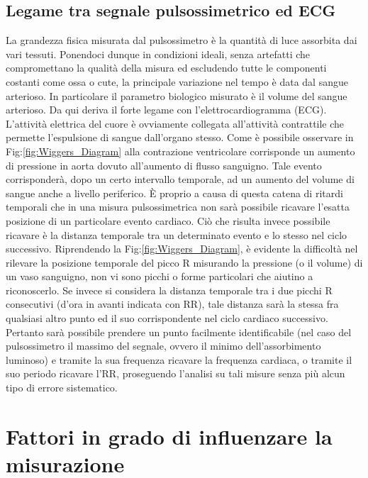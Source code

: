 \documentclass[a4paper, 12pt]{book}
\begin{document}
\subsection{Legame tra segnale pulsossimetrico ed ECG}

La grandezza fisica misurata dal pulsossimetro è la quantità di luce assorbita dai vari tessuti.
Ponendoci dunque in condizioni ideali, senza artefatti che compromettano la qualità della misura ed escludendo tutte le componenti costanti come ossa o cute, la principale variazione nel tempo è data dal sangue arterioso.
In particolare il parametro biologico misurato è il volume del sangue arterioso.
Da qui deriva il forte legame con l'elettrocardiogramma (ECG).
L'attività elettrica del cuore è ovviamente collegata all'attività contrattile che permette l'espulsione di sangue dall'organo stesso.
Come è possibile osservare in Fig:\ref{fig:Wiggers_Diagram} alla contrazione ventricolare corrisponde un aumento di pressione in aorta dovuto all'aumento di flusso sanguigno.
Tale evento corrisponderà, dopo un certo intervallo temporale, ad un aumento del volume di sangue anche a livello periferico.
È proprio a causa di questa catena di ritardi temporali che in una misura pulsossimetrica non sarà possibile ricavare l'esatta posizione di un particolare evento cardiaco.
Ciò che risulta invece possibile ricavare è la distanza temporale tra un determinato evento e lo stesso nel ciclo successivo.
Riprendendo la Fig:\ref{fig:Wiggers_Diagram}, è evidente la difficoltà nel rilevare la posizione temporale del picco R misurando la pressione (o il volume) di un vaso sanguigno, non vi sono picchi o forme particolari che aiutino a riconoscerlo.
Se invece si considera la distanza temporale tra i due picchi R consecutivi (d'ora in avanti indicata con RR), tale distanza sarà la stessa fra qualsiasi altro punto ed il suo corrispondente nel ciclo cardiaco successivo.
Pertanto sarà possibile prendere un punto facilmente identificabile (nel caso del pulsossimetro il massimo del segnale, ovvero il minimo dell'assorbimento luminoso) e tramite la sua frequenza ricavare la frequenza cardiaca, o tramite il suo periodo ricavare l'RR, proseguendo l'analisi su tali misure senza più alcun tipo di errore sistematico.



\section{Fattori in grado di influenzare la misurazione}
\end{document}
